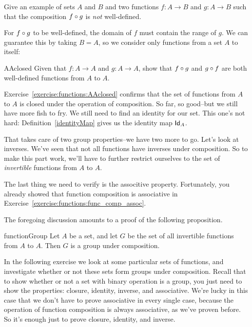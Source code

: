 \begin{exercise}{}
Give an example of sets $A$ and $B$ and two functions $f: A \rightarrow B$ and $g: A \rightarrow B$ such that the composition $f \circ g$ is \emph{not} well-defined.
\end{exercise}

For $f \circ g$ to be well-defined,  the domain of $f$ must contain the range of $g$. We can guarantee this by taking $B=A$, so we consider only functions from a set $A$ to itself:

\begin{exercise}{AAclosed}
Given that $f: A \rightarrow A$ and $g: A \rightarrow A$, show that $f \circ g$ and $g \circ f$  are both  well-defined functions from $A$ to $A$.
\end{exercise}

Exercise~\ref{exercise:functions:AAclosed} confirms that  the set of functions from $A$ to $A$ is closed under the operation of composition.
So far, so good--but we still have more fish to fry. We still need to find an identity for our set.  This one's not hard: Definition~\ref{identityMap} gives us the identity map ${\sf Id}_A$. 

That takes care of two group properties--we have two more to go. Let's look at inverses. We've seen that not all functions have inverses under composition. So to make this part work, we'll have to further restrict ourselves to the set of \emph{invertible} functions from $A$ to $A$.

The last thing we need to verify is the associtive property. Fortunately, you already showed that function composition is associative in Exercise~\ref{exercise:functions:func_comp_assoc}.

The foregoing discussion amounts to a proof of the following proposition.

\begin{prop}{functionGroup}
Let $A$ be a set, and let $G$ be the set of all invertible functions from $A$ to $A$. Then $G$ is a group under composition.
\end{prop}

In the following exercise we look at some particular sets of functions, and investigate whether or not these sets form groups under composition. Recall that to show whether or not a set with binary operation is a group, you just need to show the properties: closure, identity, inverse, and associative. We're lucky in this case that we don't have to prove associative in every single case, because the operation of function composition is always associative, as we've proven before. So it's enough just to prove closure, identity, and inverse.

